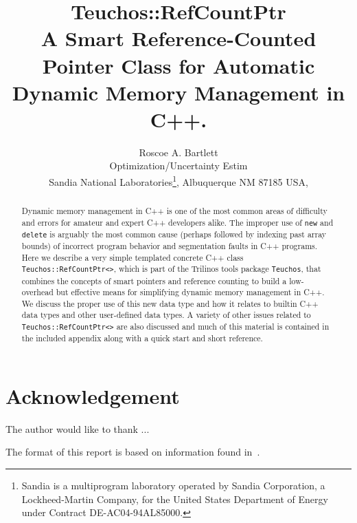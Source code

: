 \documentclass[pdf,ps2pdf,11pt]{SANDreport}
\title{\center
{\Huge\bf Teuchos::RefCountPtr}\\[1.5ex]
A Smart Reference-Counted Pointer Class for Automatic Dynamic
Memory Management in C++.
}
\author{
Roscoe A. Bartlett \\ Optimization/Uncertainty Estim \\
Sandia National Laboratories\footnote{
Sandia is a multiprogram laboratory operated by Sandia Corporation, a
Lockheed-Martin Company, for the United States Department of Energy
under Contract DE-AC04-94AL85000.}, Albuquerque NM 87185 USA, \\
}
\date{}
\begin{document}
\maketitle

%

%
\begin{abstract}
%
Dynamic memory management in C++ is one of the most common areas of
difficulty and errors for amateur and expert C++ developers alike.
The improper use of \texttt{new} and \texttt{delete} is arguably the
most common cause (perhaps followed by indexing past array bounds) of
incorrect program behavior and segmentation faults in C++ programs.
Here we describe a very simple templated concrete C++ class
{}\texttt{Teuchos::RefCountPtr<>}, which is part of the Trilinos tools
package \texttt{Teuchos}, that combines the concepts of smart pointers
and reference counting to build a low-overhead but effective means for
simplifying dynamic memory management in C++.  We discuss the proper
use of this new data type and how it relates to builtin C++ data types
and other user-defined data types.  A variety of other issues related
to \texttt{Teuchos::RefCountPtr<>} are also discussed and much of this
material is contained in the included appendix along with a quick
start and short reference.
%
\end{abstract}
%

%
\clearpage
\section*{Acknowledgement}
The author would like to thank ...

The format of this report is based on information found
in~\cite{Sand98-0730}.

%
\clearpage
\tableofcontents
\listoffigures
\listoftables
\end{document}
